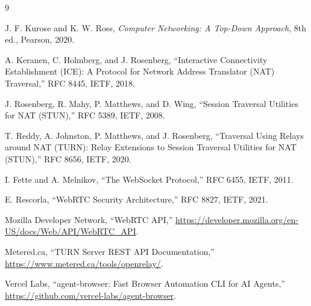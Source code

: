 \documentclass[12pt,a4paper]{report}
\begin{document}
\begin{thebibliography}{9}

J. F. Kurose and K. W. Ross, \emph{Computer Networking: A Top-Down Approach}, 8th ed.,
Pearson, 2020.

A. Keranen, C. Holmberg, and J. Rosenberg, ``Interactive Connectivity Establishment (ICE):
A Protocol for Network Address Translator (NAT) Traversal,'' RFC 8445, IETF, 2018.

J. Rosenberg, R. Mahy, P. Matthews, and D. Wing, ``Session Traversal Utilities for NAT
(STUN),'' RFC 5389, IETF, 2008.

T. Reddy, A. Johnston, P. Matthews, and J. Rosenberg, ``Traversal Using Relays around NAT
(TURN): Relay Extensions to Session Traversal Utilities for NAT (STUN),'' RFC 8656, IETF,
2020.

I. Fette and A. Melnikov, ``The WebSocket Protocol,'' RFC 6455, IETF, 2011.

E. Rescorla, ``WebRTC Security Architecture,'' RFC 8827, IETF, 2021.

Mozilla Developer Network, ``WebRTC API,'' \url{https://developer.mozilla.org/en-US/docs/Web/API/WebRTC_API}.

Metered.ca, ``TURN Server REST API Documentation,'' \url{https://www.metered.ca/tools/openrelay/}.

Vercel Labs, ``agent-browser: Fast Browser Automation CLI for AI Agents,''
\url{https://github.com/vercel-labs/agent-browser}.

\end{thebibliography}
\end{document}
